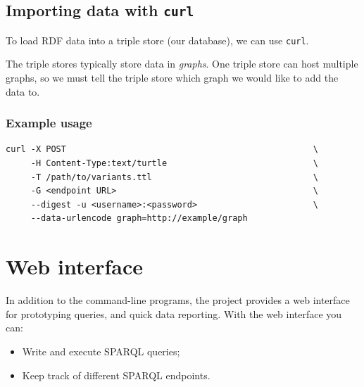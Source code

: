 \documentclass[11pt,a4paper,oneside]{book}
\begin{document}


\section{Importing data with \texttt{curl}}
\label{sec:curl}

  To load RDF data into a triple store (our database), we can use \texttt{curl}.

  The triple stores typically store data in \emph{graphs}.  One triple store
  can host multiple graphs, so we must tell the triple store which graph we
  would like to add the data to.

\subsection{Example usage}

\begin{siderules}
\begin{verbatim}
curl -X POST                                                 \
     -H Content-Type:text/turtle                             \
     -T /path/to/variants.ttl                                \
     -G <endpoint URL>                                       \
     --digest -u <username>:<password>                       \
     --data-urlencode graph=http://example/graph
\end{verbatim}
\end{siderules}

\chapter{Web interface}
\label{chap:web-interface}

  In addition to the command-line programs, the project provides a web
  interface for prototyping queries, and quick data reporting.  With the
  web interface you can:
  \begin{itemize}
  \item Write and execute SPARQL queries;
  \item Keep track of different SPARQL endpoints.
  \end{itemize}
\end{document}
